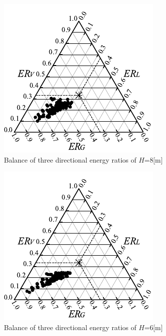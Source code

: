 \begin{figure}[htbp]
    \centering
    \includegraphics[keepaspectratio,scale=1.2]{05_att/rec_Ternary_out_8m.pdf}
    \caption{\hspace{1mm}Balance of three directional energy ratios of $H$=8[m]}
    \label{fig:sankaku8}
\end{figure}

\begin{figure}[htbp]
    \centering
    \includegraphics[keepaspectratio,scale=1.2]{05_att/rec_Ternary_out_6m.pdf}
    \caption{\hspace{1mm}Balance of three directional energy ratios of $H$=6[m]}
    \label{fig:sankaku6}
\end{figure}

